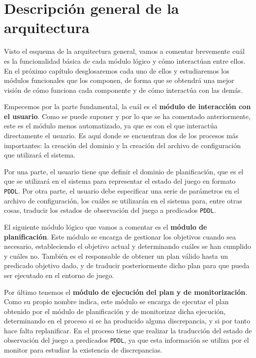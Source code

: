 
\section{Descripción general de la arquitectura}

Visto el esquema de la arquitectura general, vamos a comentar brevemente cuál es
la funcionalidad básica de cada módulo lógico y cómo interactúan entre ellos.
En el próximo capítulo desglosaremos cada uno de ellos y estudiaremos los módulos
funcionales que los componen, de forma que se obtendrá una mejor visión de cómo
funciona cada componente y de cómo interactúa con las demás.

Empecemos por la parte fundamental, la cuál es el \textbf{módulo de interacción con el usuario}.
Como se puede suponer y por lo que se ha comentado anteriormente, este es el módulo
menos automatizado, ya que es con el que interactúa directamente el usuario. Es aquí
donde se encuentran dos de los procesos más importantes: la creación del dominio y la
creación del archivo de configuración que utilizará el sistema.

Por una parte, el usuario tiene que definir el dominio de planificación, que es el que se
utilizará en el sistema para representar el estado del juego en formato \texttt{PDDL}.
Por otra parte, el usuario debe especificar una serie de parámetros en el archivo de
configuración, los cuáles se utilizarán en el sistema para, entre otras cosas, traducir los
estados de observación del juego a predicados \texttt{PDDL}.

El siguiente módulo lógico que vamos a comentar es el \textbf{módulo de planificación}.
Este módulo se encarga de gestionar los objetivos cuando sea necesario, estableciendo el
objetivo actual y determinando cuáles se han cumplido y cuáles no. También es el responsable
de obtener un plan válido hasta un predicado objetivo dado, y de traducir posteriormente
dicho plan para que pueda ser ejecutado en el entorno de juego.

Por último tenemos el \textbf{módulo de ejecución del plan y de monitorización}. Como su
propio nombre indica, este módulo se encarga de ejecutar el plan obtenido por el módulo
de planificación y de monitorizar dicha ejecución, determinando en el proceso si se ha
producido alguna discrepancia, y si por tanto hace falta replanificar. En el proceso
tiene que realizar la traducción del estado de observación del juego a predicados
\texttt{PDDL}, ya que esta información se utiliza por el monitor para estudiar la
existencia de discrepancias.

